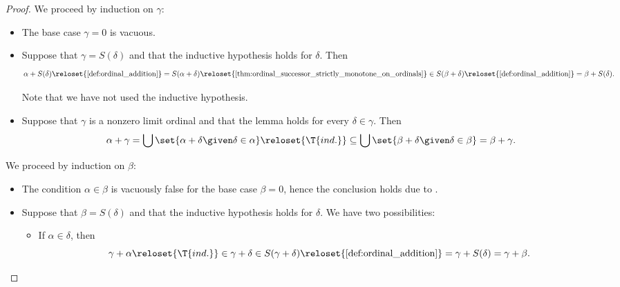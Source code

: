 \begin{proof}
   We proceed by induction on \( \gamma \):
  \begin{itemize}
    \item The base case \( \gamma = 0 \) is vacuous.
    \item Suppose that \( \gamma = S(\delta) \) and that the inductive hypothesis holds for \( \delta \). Then
    \begin{equation*}
      \alpha + S(\delta)
      \reloset {\ref{def:ordinal_addition}} =
      S(\alpha + \delta)
      \reloset {\ref{thm:ordinal_successor_strictly_monotone_on_ordinals}} \in
      S(\beta + \delta)
      \reloset {\ref{def:ordinal_addition}} =
      \beta + S(\delta).
    \end{equation*}

    Note that we have not used the inductive hypothesis.

    \item Suppose that \( \gamma \) is a nonzero limit ordinal and that the lemma holds for every \( \delta \in \gamma \). Then
    \begin{equation*}
      \alpha + \gamma
      =
      \bigcup\set{ \alpha + \delta \given \delta \in \alpha }
      \reloset {\T{ind.}} \subseteq
      \bigcup\set{ \beta + \delta \given \delta \in \beta }
      =
      \beta + \gamma.
    \end{equation*}
  \end{itemize}

   We proceed by induction on \( \beta \):
  \begin{itemize}
    \item The condition \( \alpha \in \beta \) is vacuously false for the base case \( \beta = 0 \), hence the conclusion holds due to .

    \item Suppose that \( \beta = S(\delta) \) and that the inductive hypothesis holds for \( \delta \). We have two possibilities:
    \begin{itemize}
      \item If \( \alpha \in \delta \), then
      \begin{equation*}
        \gamma + \alpha
        \reloset {\T{ind.}} \in
        \gamma + \delta
        \in
        S(\gamma + \delta)
        \reloset {\ref{def:ordinal_addition}} =
        \gamma + S(\delta)
        =
        \gamma + \beta.
      \end{equation*}


\end{itemize}
\end{itemize}
\end{proof}
